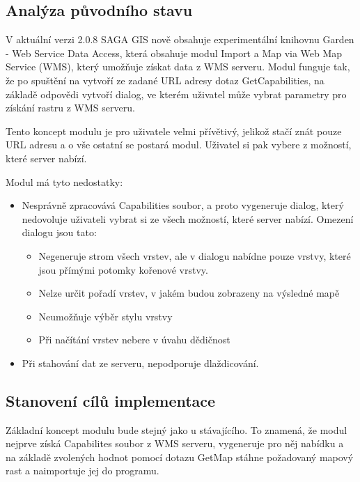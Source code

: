 \documentclass[a4paper,12pt]{article}
\begin{document}
\subsection{Analýza původního stavu}

V aktuální verzi 2.0.8 SAGA GIS nově obsahuje experimentální knihovnu Garden - Web Service Data Access, která obsahuje modul Import a Map via Web Map Service (WMS), který umožňuje získat data z WMS serveru.
Modul funguje tak, že po spuštění na vytvoří ze zadané URL adresy dotaz GetCapabilities, na základě odpovědi vytvoří dialog, ve kterém uživatel může vybrat parametry pro získání rastru z WMS serveru. 

Tento koncept modulu je pro uživatele velmi přívětivý, jelikož stačí znát pouze URL adresu a o vše ostatní se postará modul. Uživatel si pak vybere z možností, které server nabízí. 

Modul má tyto nedostatky:

\begin{itemize}
\item Nesprávně zpracovává Capabilities soubor, a proto vygeneruje dialog, který nedovoluje uživateli vybrat si ze všech možností, které server nabízí. Omezení dialogu jsou tato:
\begin{itemize}
 \item     Negeneruje strom všech vrstev, ale v dialogu nabídne pouze vrstvy, které jsou přímými potomky kořenové vrstvy.
 \item 	   Nelze určit pořadí vrstev, v jakém budou  zobrazeny na výsledné mapě
 \item 	   Neumožňuje výběr stylu vrstvy 
 \item 	   Při načítání vrstev nebere v úvahu dědičnost	   
\end{itemize}
\item Při stahování dat ze serveru, nepodporuje dlaždicování. 
\end{itemize}


 
\subsection{Stanovení cílů implementace}


Základní koncept modulu bude stejný jako u stávajícího. To znamená, že modul nejprve získá Capabilites soubor z WMS serveru, vygeneruje pro něj nabídku a na základě zvolených hodnot pomocí 
dotazu GetMap stáhne požadovaný mapový rast a naimportuje jej do programu. 
\end{document}
